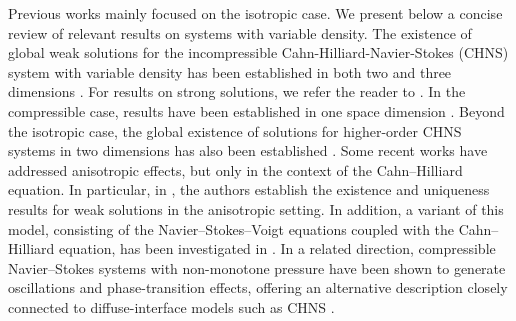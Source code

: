 \documentclass[11pt]{article}
\begin{document}
Previous works mainly focused on the isotropic case. {We present below a concise review of relevant results on systems with variable density}. The existence of global weak solutions for the incompressible Cahn-Hilliard-Navier-Stokes (CHNS) system with variable density has been established in both two and three dimensions \cite{giorgini2020weak,abels2024,munteanu2024,rui2024global,abels2013}. For results on strong solutions, we refer the reader to { \cite{giorgini2020weak, Zhao, li2024strong, kotschote2015strong}}. In the compressible case, results have been established in one space dimension \cite{Chen,Cherfils,elbar2024,giorgini2021navier,dingwell}. Beyond the isotropic case, the global existence of solutions for higher-order CHNS systems in two dimensions has also been established \cite{Jiaojiao}. {Some recent works have addressed anisotropic effects, but only in the context of the Cahn–Hilliard equation. In particular, in \cite{Garcke, garcke2023}, the authors establish the existence and uniqueness results for weak solutions in the anisotropic setting. In addition, a variant of this model, consisting of the Navier–Stokes–Voigt equations \cite{dilmi2025} coupled with the Cahn–Hilliard equation, has been investigated in \cite{giorgini2023existence}. In a related direction, compressible Navier--Stokes systems with non-monotone pressure have been shown to generate oscillations and phase-transition effects, offering an alternative description closely connected to diffuse-interface models such as CHNS \cite{tzavaras2024}.
}\\
\end{document}
